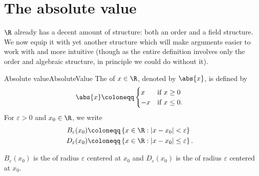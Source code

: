 \section{The absolute value}

$\R$ already has a decent amount of structure:  both an order and a field structure.  We now equip it with yet another structure which will make arguments easier to work with and more intuitive (though as the entire definition involves only the order and algebraic structure, in principle we could do without it).
\begin{dfn}{Absolute value}{AbsoluteValue}
The  of $x\in \R$, denoted by $\abs{x}$, is defined by
\begin{equation}
\abs{x}\coloneqq \begin{cases}x & \text{if }x\geq 0 \\ -x & \text{if }x\leq 0.\end{cases}
\end{equation}
For $\varepsilon >0$ and $x_0\in \R$, we write
\begin{equation}
\begin{aligned}
B_{\varepsilon}(x_0) & \coloneqq \left\{ x\in \R :|x-x_0|<\varepsilon \right\} \\
D_{\varepsilon}(x_0) & \coloneqq \left\{ x\in \R :|x-x_0|\leq \varepsilon \right\} .
\end{aligned}
\end{equation}
\begin{rmk}
$B_{\varepsilon}(x_0)$ is the  of radius $\varepsilon$ centered at $x_0$ and $D_{\varepsilon}(x_0)$ is the  of radius $\varepsilon$ centered at $x_0$.
\end{rmk}
\end{dfn}
